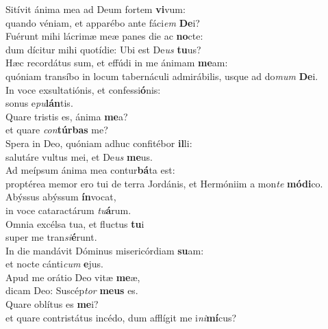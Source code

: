 \evenverse Sitívit ánima mea ad Deum fortem \textbf{vi}vum:~\*\\
\evenverse quando véniam, et apparébo ante fáci\textit{em} \textbf{De}i?\\
\oddverse Fuérunt mihi lácrimæ meæ panes die ac \textbf{no}cte:~\*\\
\oddverse dum dícitur mihi quotídie: Ubi est De\textit{us} \textbf{tu}us?\\
\evenverse Hæc recordátus sum, et effúdi in me ánimam \textbf{me}am:~\*\\
\evenverse quóniam transíbo in locum tabernáculi admirábilis, usque ad do\textit{mum} \textbf{De}i.\\
\oddverse In voce exsultatiónis, et confessi\textbf{ó}nis:~\*\\
\oddverse sonus e\textit{pu}\textbf{lán}tis.\\
\evenverse Quare tristis es, ánima \textbf{me}a?~\*\\
\evenverse et quare \textit{con}\textbf{túr}\textbf{bas} me?\\
\oddverse Spera in Deo, quóniam adhuc confitébor \textbf{il}li:~\*\\
\oddverse salutáre vultus mei, et De\textit{us} \textbf{me}us.\\
\evenverse Ad meípsum ánima mea contur\textbf{bá}ta est:~\*\\
\evenverse proptérea memor ero tui de terra Jordánis, et Hermóniim a mon\textit{te} \textbf{mó}\textbf{di}co.\\
\oddverse Abýssus abýssum \textbf{ín}vocat,~\*\\
\oddverse in voce cataractárum \textit{tu}\textbf{á}rum.\\
\evenverse Omnia excélsa tua, et fluctus \textbf{tu}i~\*\\
\evenverse super me tran\textit{si}\textbf{é}runt.\\
\oddverse In die mandávit Dóminus misericórdiam \textbf{su}am:~\*\\
\oddverse et nocte cánti\textit{cum} \textbf{e}jus.\\
\evenverse Apud me orátio Deo vitæ \textbf{me}æ,~\*\\
\evenverse dicam Deo: Suscép\textit{tor} \textbf{me}\textbf{us} es.\\
\oddverse Quare oblítus es \textbf{me}i?~\*\\
\oddverse et quare contristátus incédo, dum afflígit me i\textit{ni}\textbf{mí}cus?\\
